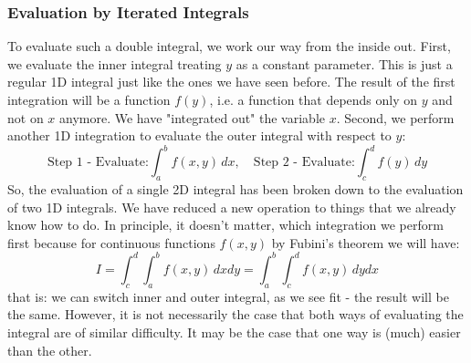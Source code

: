 \subsubsection{Evaluation by Iterated Integrals}
To evaluate such a double integral, we work our way from the inside out. First, we evaluate the inner integral treating $y$ as a constant parameter. This is just a regular 1D integral just like the ones we have seen before. The result of the first integration will be a function $f(y)$, i.e. a function that depends only on $y$ and not on $x$ anymore. We have "integrated out" the variable $x$. Second, we perform another 1D integration to evaluate the outer integral with respect to $y$:
\begin{equation}
 \text{Step 1 - Evaluate:}
 \int_a^b f(x,y) \, dx,  \quad
 \text{Step 2 - Evaluate:}
 \int_c^d f(y) \, dy
\end{equation}
So, the evaluation of a single 2D integral has been broken down to the evaluation of two 1D integrals. We have reduced a new operation to things that we already know how to do. In principle, it doesn't matter, which integration we perform first because for continuous functions $f(x,y)$ by Fubini's theorem we will have:
\begin{equation}
 I = \int_c^d \int_a^b f(x,y) \, dx dy = \int_a^b \int_c^d f(x,y) \, dy dx 
\end{equation}
that is: we can switch inner and outer integral, as we see fit - the result will be the same. However, it is not necessarily the case that both ways of evaluating the integral are of similar difficulty. It may be the case that one way is (much) easier than the other.



